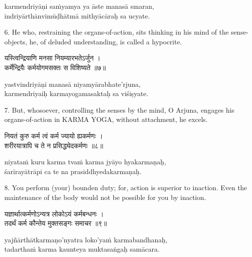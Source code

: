 \begin{transliteration}
karmendriyāṇi saṁyamya ya āste manasā smaran, \\
indriyārthānvimūḍhātmā mithyācāraḥ sa ucyate.
\end{transliteration}

6. He who, restraining the organs-of-action, sits thinking in his mind of the
sense-objects, he, of deluded understanding, is called a hypocrite.

\begin{gitaverse}
यस्त्विन्द्रियाणि मनसा नियम्यारभतेऽर्जुन । \\
कर्मेन्द्रियैः कर्मयोगमसक्तः स विशिष्यते ॥७॥
\end{gitaverse}

\begin{transliteration}
yastvindriyāṇi manasā niyamyārabhate'rjuna, \\
karmendriyaiḥ karmayogamasaktaḥ sa viśiṣyate.
\end{transliteration}

7. But, whosoever, controlling the senses by the mind, O Arjuna, engages his
organs-of-action in KARMA YOGA, without attachment, he excels.

\begin{gitaverse}
नियतं कुरु कर्म त्वं कर्म ज्यायो ह्यकर्मणः । \\
शरीरयात्रापि च ते न प्रसिद्ध्येदकर्मणः ॥८॥
\end{gitaverse}

\begin{transliteration}
niyataṁ kuru karma tvaṁ karma jyāyo hyakarmaṇaḥ, \\
śarīrayātrāpi ca te na prasiddhyedakarmaṇaḥ.
\end{transliteration}

8. You perform (your) bounden duty; for, action is superior to inaction. Even
the maintenance of the body would not be possible for you by inaction.

\begin{gitaverse}
यज्ञार्थात्कर्मणोऽन्यत्र लोकोऽयं कर्मबन्धनः । \\
तदर्थं कर्म कौन्तेय मुक्तसङ्गः समाचर ॥९॥
\end{gitaverse}

\begin{transliteration}
yajñārthātkarmaṇo'nyatra loko'yaṁ karmabandhanaḥ, \\
tadarthaṁ karma kaunteya muktasaṅgaḥ samācara.
\end{transliteration}

